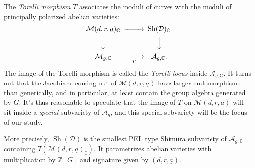 \documentclass[reqno]{amsart} 
\begin{document}
The \emph{Torelli morphism} $T$ associates the moduli of curves with the moduli of principally polarized abelian varieties:
\begin{equation*}
  \begin{CD}
    \mathcal{M}(d, r, \underline{a})_{\mathbb{C}}  @>>> \operatorname{Sh}(\mathcal{D})_{\mathbb{C}}\\
    @VVV  @VVV \\
    \mathcal{M}_{g, \mathbb{C}} @>>T> \mathcal{A}_{g, \mathbb{C}}.\\
  \end{CD}
\end{equation*}
The image of the Torelli morphism is called the \emph{Torelli locus} inside $\mathcal{A}_{g, \mathbb{C}}$.  It turns out that the Jacobians coming out of $\mathcal{M}(d, r, \underline{a})$ have larger endomorphisms than generically, and in particular, at least contain the group algebra generated by $G$.  It's thus reasonable to speculate that the image of $T$ on $\mathcal{M}(d, r, a)$ will sit inside a \emph{special} subvariety of $\mathcal{A}_g$, and this special subvariety will be the focus of our study.

More precisely, $\operatorname{Sh}(\mathcal{D})$ is the smallest PEL type Shimura subvariety of $\mathcal{A}_{g, \mathbb{C}}$ containing $T(\mathcal{M}(d, r, \underline{a})_{\mathbb{C}})$.  It parametrizes abelian varieties with multiplication by $\mathbb{Z}[G]$ and signature given by $(d, r, \underline{a})$.
\end{document}
